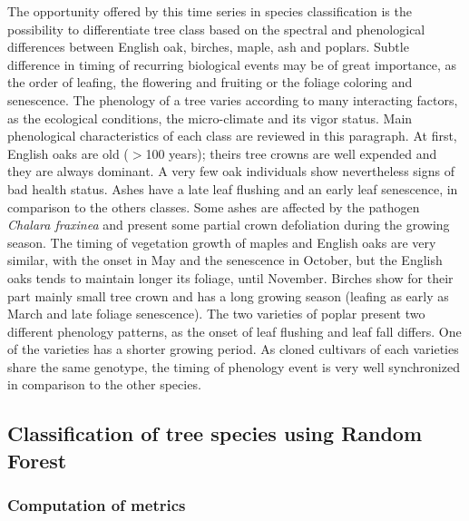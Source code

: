 \documentclass[remotesensing,article,submit,moreauthors,pdftex,12pt,a4paper]{mdpi} %
\begin{document}
The opportunity offered by this time series in species classification is the possibility to differentiate tree class based on the spectral and phenological differences between English oak, birches, maple, ash and poplars. 
Subtle difference in timing of recurring biological events may be of great importance, as the order of leafing, the flowering and fruiting or the foliage coloring and senescence. 
The phenology of a tree varies according to many interacting factors, as the ecological conditions, the micro-climate and its vigor status.
Main phenological characteristics of each class are reviewed in this paragraph. 
At first, English oaks are old ($>$100 years); theirs tree crowns are well expended and they are always dominant.
A very few oak individuals show nevertheless signs of bad health status. 
Ashes have a late leaf flushing and an early leaf senescence, in comparison to the others classes. 
Some ashes are affected by the pathogen \textit{Chalara fraxinea} \cite{husson_chalara_2011} and present some partial crown defoliation during the growing season. 
The timing of vegetation growth of maples and English oaks are very similar, with the onset in May and the senescence in October, but the English oaks tends to maintain longer its foliage, until November. 
Birches show for their part mainly small tree crown and has a long growing season (leafing as early as March and late foliage senescence). 
The two varieties of poplar present two different phenology patterns, as the onset of leaf flushing and leaf fall differs. 
One of the varieties has a shorter growing period.
As cloned cultivars of each varieties share the same genotype, the timing of phenology event is very well synchronized in comparison to the other species.


\subsection{Classification of tree species using Random Forest} %

\subsubsection{Computation of metrics}
\end{document}
